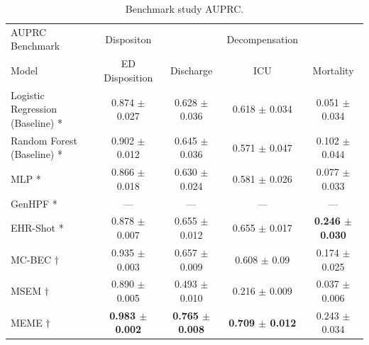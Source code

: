 \documentclass[pmlr]{jmlr}%
\begin{document}
\begin{table}[H]
\caption{Benchmark study AUPRC.}
\label{r3}
\begin{adjustbox}{width=\textwidth}
\begin{small}
\begin{tabular}{l|c|ccc}
\toprule
AUPRC Benchmark & Dispositon & & Decompensation &\\
Model & ED Disposition & Discharge & ICU & Mortality \\
\midrule
Logistic Regression (Baseline) * &0.874 $\pm$ 0.027&0.628 $\pm$ 0.036& 0.618 $\pm$ 0.034& 0.051 $\pm$ 0.034\\
Random Forest (Baseline) *& 0.902 $\pm$ 0.012 & 0.645 $\pm$ 0.036 & 0.571 $\pm$ 0.047 &  0.102 $\pm$ 0.044  \\
MLP *& 0.866 $\pm$ 0.018 & 0.630 $\pm$ 0.024 & 0.581 $\pm$ 0.026 & 0.077 $\pm$ 0.033 \\
GenHPF * & --- & --- & ---& ---   \\
EHR-Shot *& 0.878 $\pm$ 0.007 & 0.655 $\pm $ 0.012 & 0.655 $\pm$ 0.017 & \textbf{0.246 $\pm$ 0.030} \\
MC-BEC $\dagger$& 0.935 $\pm$ 0.003& 0.657 $\pm$ 0.009 & 0.608 $\pm$ 0.09& 0.174 $\pm$ 0.025 \\
MSEM $\dagger$& 0.890 $\pm$ 0.005 & 0.493 $\pm$ 0.010 & 0.216 $\pm$ 0.009 & 0.037 $\pm$ 0.006\\
MEME $\dagger$& \textbf{0.983 $\pm$ 0.002} & \textbf{0.765 $\pm$ 0.008} & \textbf{0.709 $\pm$ 0.012} & 0.243 $\pm$ 0.034 \\
\bottomrule
\end{tabular}
\end{small}
\end{adjustbox}
\end{table}
\end{document}
